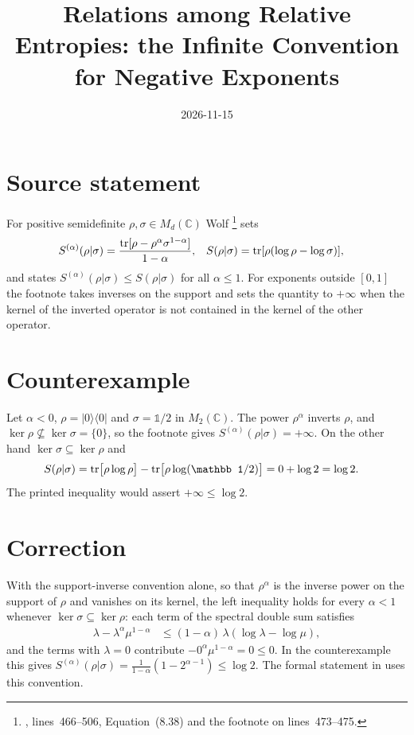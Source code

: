 \documentclass{article}
\title{Relations among Relative Entropies: the Infinite Convention for Negative Exponents}
\author{}
\date{2026-11-15}
\begin{document}
\maketitle
{}

\section{Source statement}
For positive semidefinite $\rho,\sigma\in M_d(\mathbb C)$ Wolf
\cite{Wolf2012Quantum}%
\footnote{,
lines~466--506, Equation~(8.38) and the footnote on lines~473--475.}
sets
\begin{align}
    S^{(\alpha)}(\rho|\sigma)
        &= \frac{\operatorname{tr}[\rho-\rho^\alpha\sigma^{1-\alpha}]}{1-\alpha},
    &
    S(\rho|\sigma) &= \operatorname{tr}[\rho(\log\rho-\log\sigma)],
    \label{eq:tnef_definitions}
\end{align}
and states $S^{(\alpha)}(\rho|\sigma)\le S(\rho|\sigma)$ for all $\alpha\le1$.
For exponents outside $[0,1]$ the footnote takes inverses on the support and
sets the quantity to $+\infty$ when the kernel of the inverted operator is
not contained in the kernel of the other operator.

\section{Counterexample}
Let $\alpha<0$, $\rho=\lvert0\rangle\langle0\rvert$ and $\sigma=\mathbb 1/2$ in
$M_2(\mathbb C)$. The power $\rho^\alpha$ inverts $\rho$, and
$\ker\rho\not\subseteq\ker\sigma=\{0\}$, so the footnote gives
$S^{(\alpha)}(\rho|\sigma)=+\infty$. On the other hand $\ker\sigma\subseteq\ker\rho$
and
\begin{align}
    S(\rho|\sigma) &= \tr\bigl[\rho\log\rho\bigr]-\tr\bigl[\rho\log(\mathbb 1/2)\bigr]
        = 0+\log2=\log2 .
    \label{eq:tnef_counterexample}
\end{align}
The printed inequality would assert $+\infty\le\log2$.

\section{Correction}
With the support-inverse convention alone, so that $\rho^\alpha$ is the
inverse power on the support of $\rho$ and vanishes on its kernel, the left
inequality holds for every $\alpha<1$ whenever $\ker\sigma\subseteq\ker\rho$:
each term of the spectral double sum satisfies
\begin{align}
    \lambda-\lambda^\alpha\mu^{1-\alpha}
        &\le(1-\alpha)\,\lambda(\log\lambda-\log\mu),
    \label{eq:tnef_scalar}
\end{align}
and the terms with $\lambda=0$ contribute $-0^\alpha\mu^{1-\alpha}=0\le0$.
In the counterexample this gives $S^{(\alpha)}(\rho|\sigma)=\tfrac{1}{1-\alpha}
(1-2^{\alpha-1})\le\log2$. The formal statement in
 uses this convention.
\end{document}
